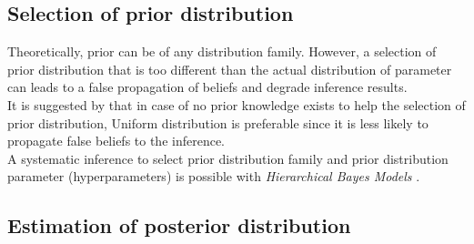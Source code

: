 \subsection{Selection of prior distribution}
Theoretically, prior can be of any distribution family. However, a selection of prior distribution
that is too different than the actual distribution of parameter can leads to a false propagation of
beliefs and degrade inference results.\\
It is suggested by \cite{polgreen2016data} that in case of no prior knowledge exists to help the
selection of prior distribution, Uniform distribution is preferable since it is less likely to
propagate false beliefs to the inference.\\
A systematic inference to select prior distribution family and prior distribution parameter
(hyperparameters) is possible with \textit{Hierarchical Bayes Models}
\cite{allenby2005hierarchical}.

\subsection{Estimation of posterior distribution}
